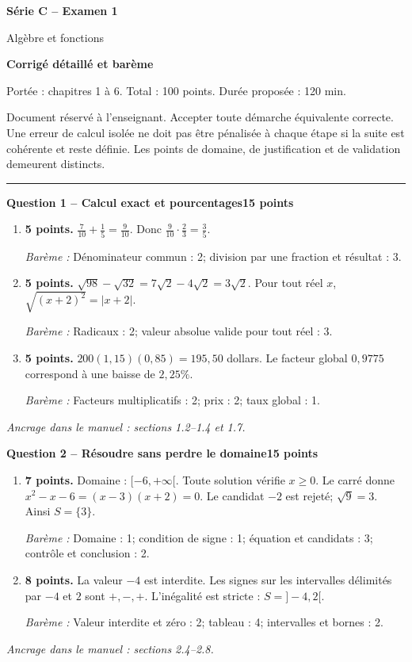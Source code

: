 \documentclass[11pt,a4paper]{article}
\begin{document}
{\LARGE\bfseries Série C -- Examen 1}\par
{\large Algèbre et fonctions}\par
\textbf{Corrigé détaillé et barème}\par
Portée : chapitres 1 à 6. Total : 100 points. Durée proposée : 120 min.\par
\small Document réservé à l’enseignant. Accepter toute démarche équivalente correcte. Une erreur de calcul isolée ne doit pas être pénalisée à chaque étape si la suite est cohérente et reste définie. Les points de domaine, de justification et de validation demeurent distincts.\normalsize\par
\vspace{3mm}\hrule\vspace{4mm}
{\large\bfseries Question 1 -- Calcul exact et pourcentages}\hfill\textbf{15 points}\par
\begin{enumerate}
\item \textbf{5 points.} \(\frac7{10}+\frac15=\frac9{10}\). Donc \(\frac9{10}\cdot\frac23=\frac35\).
\par{\small\textit{Barème : }Dénominateur commun : 2; division par une fraction et résultat : 3.}
\item \textbf{5 points.} \(\sqrt{98}-\sqrt{32}=7\sqrt2-4\sqrt2=3\sqrt2\). Pour tout réel \(x\), \(\sqrt{(x+2)^2}=|x+2|\).
\par{\small\textit{Barème : }Radicaux : 2; valeur absolue valide pour tout réel : 3.}
\item \textbf{5 points.} \(200(1{,}15)(0{,}85)=195{,}50\) dollars. Le facteur global \(0{,}9775\) correspond à une baisse de \(2{,}25\%\).
\par{\small\textit{Barème : }Facteurs multiplicatifs : 2; prix : 2; taux global : 1.}
\end{enumerate}
\vfill {\small\textit{Ancrage dans le manuel : sections 1.2--1.4 et 1.7.}}

\newpage
{\large\bfseries Question 2 -- Résoudre sans perdre le domaine}\hfill\textbf{15 points}\par
\begin{enumerate}
\item \textbf{7 points.} Domaine : \([-6,+\infty[\). Toute solution vérifie \(x\ge0\). Le carré donne \(x^2-x-6=(x-3)(x+2)=0\). Le candidat \(-2\) est rejeté; \(\sqrt9=3\). Ainsi \(S=\{3\}\).
\par{\small\textit{Barème : }Domaine : 1; condition de signe : 1; équation et candidats : 3; contrôle et conclusion : 2.}
\item \textbf{8 points.} La valeur \(-4\) est interdite. Les signes sur les intervalles délimités par \(-4\) et \(2\) sont \(+, -, +\). L’inégalité est stricte : \(S=]-4,2[\).
\par{\small\textit{Barème : }Valeur interdite et zéro : 2; tableau : 4; intervalles et bornes : 2.}
\end{enumerate}
\vfill {\small\textit{Ancrage dans le manuel : sections 2.4--2.8.}}
\end{document}
